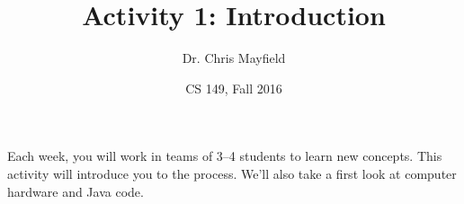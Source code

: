 \documentclass[12pt]{article}
\title{Activity 1: Introduction}
\author{Dr. Chris Mayfield}
\date{CS 149, Fall 2016}
\begin{document}
\maketitle

Each week, you will work in teams of 3--4 students to learn new concepts.
This activity will introduce you to the process.
We'll also take a first look at computer hardware and Java code.





\end{document}
